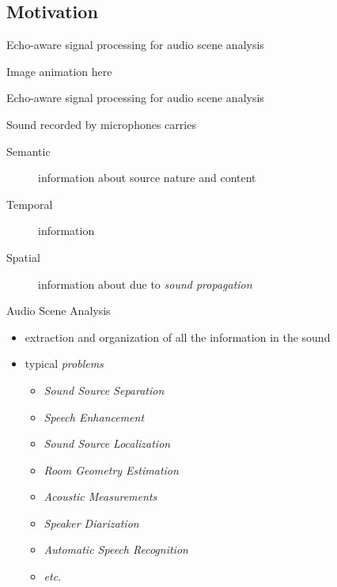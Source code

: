 \subsection{Motivation}

\begin{frame}{Echo-aware signal processing for \alert{audio scene analysis}}

    Image animation here

\end{frame}

\begin{frame}{Echo-aware signal processing for \alert{audio scene analysis}}

    \begin{block}{Sound recorded by microphones carries}
        \begin{description}
            \item[Semantic] information about source nature and content
            \item[Temporal] information
            \item[Spatial] information about due to \textit{sound propagation}
        \end{description}
    \end{block}

    \begin{block}{Audio Scene Analysis}
        \begin{itemize}
            \item extraction and organization of all the information in the sound
            \item typical \textit{problems}
            \begin{multicols}{2}
            \begin{itemize}
                \item \alert{\textit{Sound Source Separation}}
                \item \alert{\textit{Speech Enhancement}}
                \item \alert{\textit{Sound Source Localization}}
                \item \alert{\textit{Room Geometry Estimation}}
                \item \textit{Acoustic Measurements}
                \item \textit{Speaker Diarization}
                \item \textit{Automatic Speech Recognition}
                \item \textit{etc}.
            \end{itemize}
            \end{multicols}
        \end{itemize}
    \end{block}

\end{frame}


